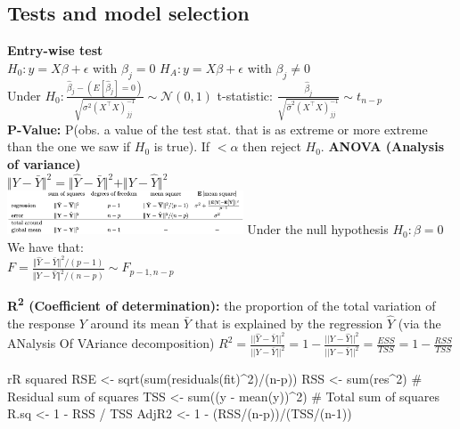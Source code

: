 \subsection{Tests and model selection}
\textbf{Entry-wise test}\\
$H_0: y = X\beta + \epsilon$ with $\beta_j=0$
$H_A: y = X\beta + \epsilon$ with $\beta_j\neq 0$\\
Under $H_0: \frac{\hat \beta_j - (E[\hat \beta_j]=0)}{\sqrt{\sigma^2(X^\top X)^{-1}_{jj}}} \sim \mathcal{N}(0,1)$
t-statistic: $\frac{\hat \beta_j}{\sqrt{\hat \sigma^2 (X^\top X)^{-1}_{jj}}} \sim t_{n-p}$\\
\textbf{P-Value:} P(obs. a value of the test stat. that is as extreme or more extreme than the one we saw if $H_0$ is true).
If $< \alpha$ then reject $H_0$.
\textbf{ANOVA (Analysis of variance)}\\
$\Vert Y-\bar Y \Vert^2=\Vert  \hat Y - \bar Y\Vert^2+\Vert Y-\hat Y\Vert^2$\\
\includegraphics[width = 7cm]{ANOVA.png}
Under the null hypothesis $H_0:\beta = 0$ We have that:\\
$F=\frac{\Vert  \hat Y - \bar Y\Vert^2/(p-1)}{\Vert Y-\hat Y\Vert^2/(n-p)}\sim F_{p-1,n-p}$\\



\textbf{R\textsuperscript{2} (Coefficient of determination):} the proportion of the total variation of the response $Y$ around its mean $\bar{Y}$ that is explained by the regression $$ (via the ANalysis Of VAriance decomposition)
$R^2==1- =  = 1-$

\begin{codebox}{r}{R squared}
RSE <- sqrt(sum(residuals(fit)^2)/(n-p))
RSS <- sum(res^2) # Residual sum of squares
TSS <- sum((y - mean(y))^2) # Total sum of squares
R.sq <- 1 - RSS / TSS
AdjR2 <- 1 - (RSS/(n-p))/(TSS/(n-1))
\end{codebox}

